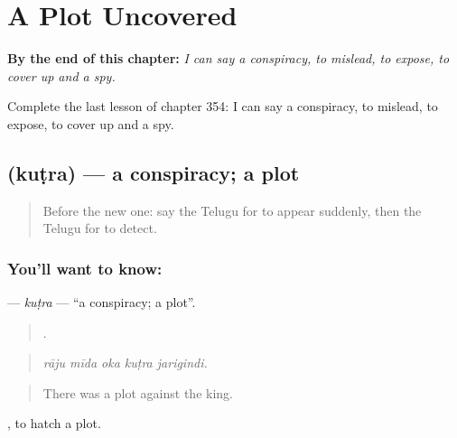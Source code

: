 
\chapter{A Plot Uncovered}
\label{ch:te-a-plot-uncovered}

\begin{chapteropening}
\textbf{By the end of this chapter:} \emph{I can say a conspiracy, to mislead, to expose, to cover up and a spy.}

Complete the last lesson of chapter 354: I can say a conspiracy, to mislead, to expose, to cover up and a spy.
\end{chapteropening}

\section[\texorpdfstring{\te{కుట్ర} (kuṭra)}{కుట్ర (kuṭra)}]{ (kuṭra) — a conspiracy; a plot}

\label{lesson:TE-C354-kutra}



\begin{quote}
Before the new one: say the Telugu for to appear suddenly, then the Telugu for to detect.
\end{quote}

\subsection*{You'll want to know: }
\textbf{} — \emph{kuṭra} — \textquotedblleft{}a conspiracy; a plot\textquotedblright{}.

\begin{quote}
    .
\end{quote}

\begin{quote}
\emph{rāju mīda oka kuṭra jarigindi.}
\end{quote}

\begin{quote}
There was a plot against the king.
\end{quote}

 , to hatch a plot.

